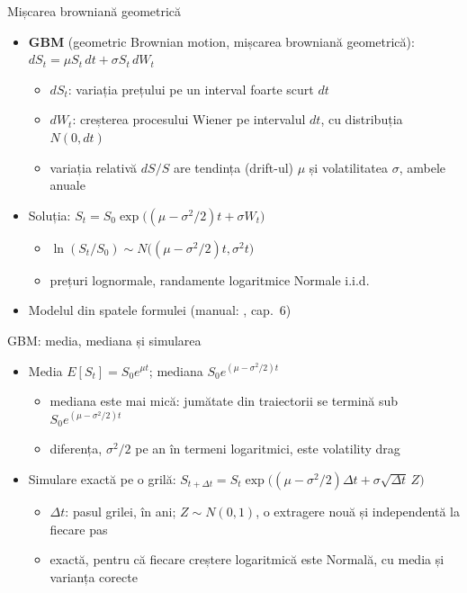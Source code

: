 \begin{frame}{Mișcarea browniană geometrică}
\itemsize{\footnotesize}
\begin{itemize}
    \item \textbf{GBM} (geometric Brownian motion, mișcarea browniană geometrică): $dS_t = \mu S_t\,dt + \sigma S_t\,dW_t$
    \begin{itemize}
        \item $dS_t$: variația prețului pe un interval foarte scurt $dt$
        \item $dW_t$: creșterea procesului Wiener pe intervalul $dt$, cu distribuția $N(0, dt)$
        \item variația relativă $dS/S$ are tendința (drift-ul) $\mu$ și volatilitatea $\sigma$, ambele anuale
    \end{itemize}
    \item Soluția: $S_t = S_0\exp\big((\mu - \sigma^2/2)t + \sigma W_t\big)$
    \begin{itemize}
        \item $\ln(S_t/S_0) \sim N\big((\mu - \sigma^2/2)t, \sigma^2 t\big)$
        \item prețuri lognormale, randamente logaritmice Normale i.i.d.
    \end{itemize}
    \item Modelul din spatele formulei  (manual: , cap.~6)
\end{itemize}
\end{frame}

\begin{frame}{GBM: media, mediana și simularea}
\itemsize{\small}
\begin{itemize}
    \item Media $E[S_t] = S_0e^{\mu t}$; mediana $S_0e^{(\mu - \sigma^2/2)t}$
    \begin{itemize}
        \item mediana este mai mică: jumătate din traiectorii se termină sub $S_0e^{(\mu - \sigma^2/2)t}$
        \item diferența, $\sigma^2/2$ pe an în termeni logaritmici, este volatility drag
    \end{itemize}
    \item Simulare exactă pe o grilă: $S_{t + \Delta t} = S_t\exp\big((\mu - \sigma^2/2)\Delta t + \sigma\sqrt{\Delta t}\,Z\big)$
    \begin{itemize}
        \item $\Delta t$: pasul grilei, în ani; $Z \sim N(0, 1)$, o extragere nouă și independentă la fiecare pas
        \item exactă, pentru că fiecare creștere logaritmică este Normală, cu media și varianța corecte
    \end{itemize}
\end{itemize}
\end{frame}

